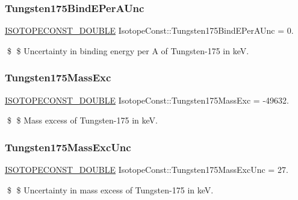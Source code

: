 \subsubsection{\texorpdfstring{Tungsten175\+Bind\+E\+Per\+A\+Unc}{Tungsten175BindEPerAUnc}}
{\footnotesize\ttfamily \mbox{\hyperlink{group___isotope_const-_macros_ga8f45a7272ce02c0b4c65c44636ed719a}{I\+S\+O\+T\+O\+P\+E\+C\+O\+N\+S\+T\+\_\+\+D\+O\+U\+B\+LE}} Isotope\+Const\+::\+Tungsten175\+Bind\+E\+Per\+A\+Unc = 0.}

\$ \$ Uncertainty in binding energy per A of Tungsten-\/175 in keV. \mbox{\label{group___isotope_const-_tungsten-_w175_ga9be4ae782bb60466035f94c50a760cce}} 
\subsubsection{\texorpdfstring{Tungsten175\+Mass\+Exc}{Tungsten175MassExc}}
{\footnotesize\ttfamily \mbox{\hyperlink{group___isotope_const-_macros_ga8f45a7272ce02c0b4c65c44636ed719a}{I\+S\+O\+T\+O\+P\+E\+C\+O\+N\+S\+T\+\_\+\+D\+O\+U\+B\+LE}} Isotope\+Const\+::\+Tungsten175\+Mass\+Exc = -\/49632.}

\$ \$ Mass excess of Tungsten-\/175 in keV. \mbox{\label{group___isotope_const-_tungsten-_w175_ga0881d1a11ddd90191797b9cdc19119ee}} 
\subsubsection{\texorpdfstring{Tungsten175\+Mass\+Exc\+Unc}{Tungsten175MassExcUnc}}
{\footnotesize\ttfamily \mbox{\hyperlink{group___isotope_const-_macros_ga8f45a7272ce02c0b4c65c44636ed719a}{I\+S\+O\+T\+O\+P\+E\+C\+O\+N\+S\+T\+\_\+\+D\+O\+U\+B\+LE}} Isotope\+Const\+::\+Tungsten175\+Mass\+Exc\+Unc = 27.}

\$ \$ Uncertainty in mass excess of Tungsten-\/175 in keV. \mbox{\label{group___isotope_const-_tungsten-_w175_ga598ca4844fe4c45eff7337527c7f4685}} 
